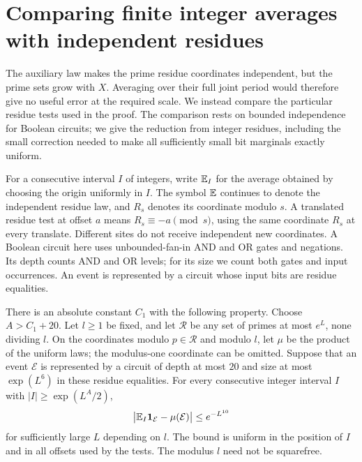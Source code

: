 \section{Comparing finite integer averages with independent residues}
\label{q:finite-law-section}

The auxiliary law makes the prime residue coordinates independent,
but the prime sets grow with $X$.  Averaging over their full joint
period would therefore give no useful error at the required scale.
We instead compare the particular residue tests used in the proof.
The comparison rests on bounded independence for Boolean circuits;
we give the reduction from integer residues, including the small
correction needed to make all sufficiently small bit marginals exactly uniform.

For a consecutive interval $I$ of integers, write $\mathbb E_I$ for the
average obtained by choosing the origin uniformly in $I$.
The symbol $\mathbb E$ continues to denote the independent residue law,
and $R_s$ denotes its coordinate modulo $s$.
A translated residue test at offset $a$ means
$R_s\equiv-a\pmod s$, using the same coordinate $R_s$ at every
translate.  Different sites do not receive independent new coordinates.
A Boolean circuit here uses unbounded-fan-in AND and OR gates and
negations.  Its depth counts AND and OR levels; for its size we count
both gates and input occurrences.  An event is represented by a circuit
whose input bits are residue equalities.

\begin{lemma}\label{q:finite-law}
There is an absolute constant $C_1$ with the following property.
Choose $A>C_1+20$.  Let $l\ge1$ be fixed, and let $\mathcal R$ be any
set of primes at most $e^L$, none dividing $l$.  On the coordinates
modulo $p\in\mathcal R$ and modulo $l$, let $\mu$ be the product of
the uniform laws; the modulus-one coordinate can be omitted.
Suppose that an event $\mathcal E$ is represented by a circuit of
depth at most $20$ and size at most $\exp(L^6)$ in these residue
equalities.  For every consecutive integer interval $I$ with
$|I|\ge\exp(L^A/2)$,
\begin{equation}\label{q:finite-law-bound}
 \bigl|\mathbb E_I\mathbf 1_{\mathcal E}-\mu(\mathcal E)\bigr|
       \le e^{-L^{10}}
\end{equation}
for sufficiently large $L$ depending on $l$.
The bound is uniform in the position of $I$ and in all offsets used
by the tests.  The modulus $l$ need not be squarefree.
\end{lemma}

